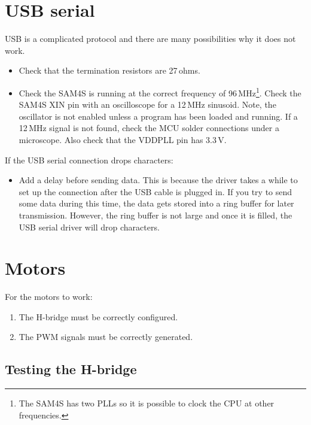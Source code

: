 \section{USB serial}
\label{debugging-usb}

USB is a complicated protocol and there are many possibilities why it
does not work.

  \begin{itemize}
  \item
    Check that the termination resistors are 27\,ohms.

  \item Check the SAM4S is running at the correct frequency of
    96\,MHz\footnote{The SAM4S has two PLLs so it is possible to clock
      the CPU at other frequencies.}.  Check the SAM4S XIN pin with an
    oscilloscope for a 12\,MHz sinusoid.  Note, the oscillator is not
    enabled unless a program has been loaded and running. If a 12\,MHz
    signal is not found, check the MCU solder connections under a
    microscope. Also check that the VDDPLL pin has 3.3\,V.
  \end{itemize}

  If the USB serial connection drops characters:
 \begin{itemize}
 \item Add a delay before sending data.  This is because the driver
   takes a while to set up the connection after the USB cable is
   plugged in.  If you try to send some data during this time, the
   data gets stored into a ring buffer for later transmission.
   However, the ring buffer is not large and once it is filled, the
   USB serial driver will drop characters.
 \end{itemize}


\section{Motors}
\label{motors-testing}

For the motors to work:
%
\begin{enumerate}
\item The H-bridge must be correctly configured.
\item The PWM signals must be correctly generated.
\end{enumerate}


\subsection{Testing the H-bridge}
\label{testing-the-h-bridge}

